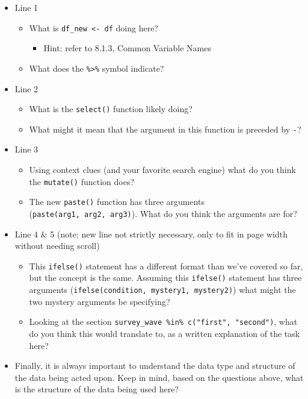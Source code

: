 \documentclass[
]{book}
\providecommand{\tightlist}{%
  \setlength{\itemsep}{0pt}\setlength{\parskip}{0pt}}
\begin{document}
\begin{itemize}
\tightlist
\item
  Line 1

  \begin{itemize}
  \tightlist
  \item
    What is \texttt{df\_new\ \textless{}-\ df} doing here?

    \begin{itemize}
    \tightlist
    \item
      Hint: refer to 8.1.3, Common Variable Names
    \end{itemize}
  \item
    What does the \texttt{\%\textgreater{}\%} symbol indicate?
  \end{itemize}
\item
  Line 2

  \begin{itemize}
  \tightlist
  \item
    What is the \texttt{select()} function likely doing?
  \item
    What might it mean that the argument in this function is preceded by \texttt{-}?
  \end{itemize}
\item
  Line 3

  \begin{itemize}
  \tightlist
  \item
    Using context clues (and your favorite search engine) what do you think the \texttt{mutate()} function does?
  \item
    The new \texttt{paste()} function has three arguments (\texttt{paste(arg1,\ arg2,\ arg3)}). What do you think the arguments are for?
  \end{itemize}
\item
  Line 4 \& 5 (note: new line not strictly necessary, only to fit in page width without needing scroll)

  \begin{itemize}
  \tightlist
  \item
    This \texttt{ifelse()} statement has a different format than we've covered so far, but the concept is the same. Assuming this \texttt{ifelse()} statement has three arguments (\texttt{ifelse(condition,\ mystery1,\ mystery2)}) what might the two mystery arguments be specifying?
  \item
    Looking at the section \texttt{survey\_wave\ \%in\%\ c("first",\ "second")}, what do you think this would translate to, as a written explanation of the task here?
  \end{itemize}
\item
  Finally, it is always important to understand the data type and structure of the data being acted upon. Keep in mind, based on the questions above, what is the structure of the data being used here?
\end{itemize}
\end{document}
